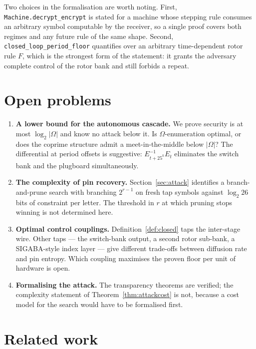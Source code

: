 \documentclass[11pt]{article}
\theoremstyle{definition}
\newcommand{\Om}{\Omega}
\newcommand{\lean}[1]{{\small\texttt{#1}}}
\begin{document}
Two choices in the formalisation are worth noting. First,
\lean{Machine.decrypt\_encrypt} is stated for a machine whose stepping rule
consumes an arbitrary symbol computable by the receiver, so a single proof
covers both regimes and any future rule of the same shape. Second,
\lean{closed\_loop\_period\_floor} quantifies over an arbitrary time-dependent
rotor rule $F$, which is the strongest form of the statement: it grants the
adversary complete control of the rotor bank and still forbids a repeat.

\section{Open problems}\label{sec:open}

\begin{enumerate}[leftmargin=1.4em]
\item \textbf{A lower bound for the autonomous cascade.} We prove security is at
most $\log_2|\Om|$ and know no attack below it. Is $\Om$-enumeration optimal, or
does the coprime structure admit a meet-in-the-middle below $|\Om|$? The
differential at period offsets is suggestive: $E_{t+25^{k}}^{-1}E_t$ eliminates
the switch bank and the plugboard simultaneously.
\item \textbf{The complexity of pin recovery.} Section~\ref{sec:attack}
identifies a branch-and-prune search with branching $2^{r-1}$ on fresh tap
symbols against $\log_2 26$ bits of constraint per letter. The threshold in $r$
at which pruning stops winning is not determined here.
\item \textbf{Optimal control couplings.} Definition~\ref{def:closed} taps the
inter-stage wire. Other taps --- the switch-bank output, a second rotor
sub-bank, a SIGABA-style index layer --- give different trade-offs between
diffusion rate and pin entropy. Which coupling maximises the proven floor per
unit of hardware is open.
\item \textbf{Formalising the attack.} The transparency theorems are verified;
the complexity statement of Theorem~\ref{thm:attackcost} is not, because a cost
model for the search would have to be formalised first.
\end{enumerate}

\section{Related work}\label{sec:related}
\end{document}

